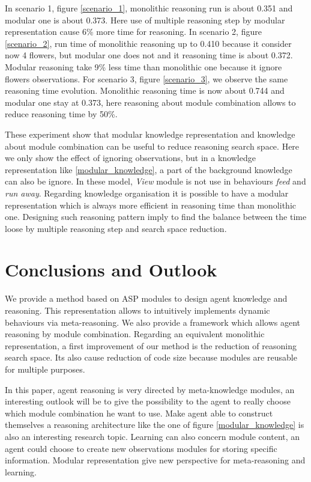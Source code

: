 \documentclass{aamas2012}
\begin{document}
	In scenario 1, figure \ref{scenario_1}, monolithic reasoning run is about 0.351 and modular one is about 0.373.
	Here use of multiple reasoning step by modular representation cause 6\% more time for reasoning.
	In scenario 2, figure \ref{scenario_2}, run time of monolithic reasoning up to 0.410 because it consider now 4 flowers, but
	modular one does not and it reasoning time is about 0.372.
	Modular reasoning take 9\% less time than monolithic one because it ignore flowers observations.
	For scenario 3, figure \ref{scenario_3}, we observe the same reasoning time evolution.
	Monolithic reasoning time is now about 0.744 and modular one stay at 0.373, here reasoning about module combination allows to reduce reasoning time by 50\%.
	
	These experiment show that modular knowledge representation and knowledge about module combination can be useful to reduce reasoning search space.
	Here we only show the effect of ignoring observations, but in a knowledge representation like \ref{modular_knowledge}, a part of the background knowledge can
	also be ignore. In these model, \emph{View} module is not use in behaviours \emph{feed} and \emph{run away}.
	Regarding knowledge organisation it is possible to have a modular representation which is always more efficient in reasoning time than monolithic one.
	Designing such reasoning pattern imply to find the balance between the time loose by multiple reasoning step and search space reduction.
	
\section{Conclusions and Outlook}

	We provide a method based on ASP modules to design agent knowledge and reasoning.
	This representation allows to intuitively implements dynamic behaviours via meta-reasoning.
	We also provide a framework which allows agent reasoning by module combination.
	Regarding an equivalent monolithic representation, a first improvement of our method is the reduction of reasoning search space.
	Its also cause reduction of code size because modules are reusable for multiple purposes.
	
	In this paper, agent reasoning is very directed by meta-knowledge modules, 
	an interesting outlook will be to give the possibility to the agent to really choose which module combination he want to use.
	Make agent able to construct themselves a reasoning architecture like the one of figure \ref{modular_knowledge} is also an interesting research topic.
	Learning can also concern module content, an agent could choose to create new observations modules for storing specific information.
	Modular representation give new perspective for meta-reasoning and learning.
%

%
%

\end{document}
